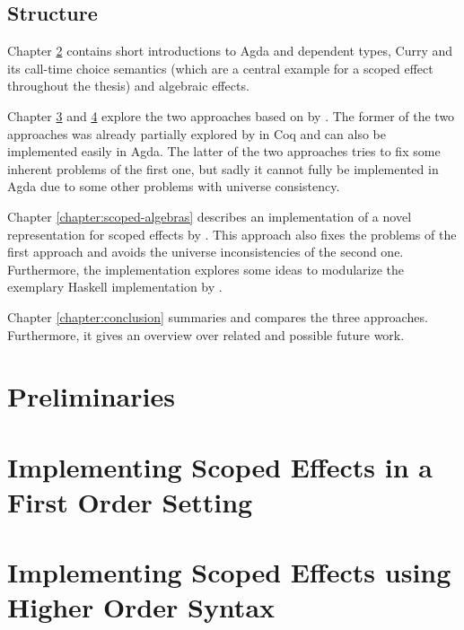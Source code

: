 \documentclass[10pt,a4paper,twoside,notitlepage]{report}
\begin{document}
\section{Structure}

Chapter \ref{chapter:preliminaries} contains short introductions to Agda and
dependent types, Curry and its call-time choice semantics (which are a central
example for a scoped effect throughout the thesis) and algebraic effects.

Chapter \ref{chapter:first-order} and \ref{chapter:higher-order} explore the two
approaches based on  by
\textcite{DBLP:conf/haskell/WuSH14}.
The former of the two approaches was already partially explored by
\textcite{bunkenburg2019modeling} in Coq and can also be implemented
easily in Agda.
The latter of the two approaches tries to fix some inherent problems of the
first one, but sadly it cannot fully be implemented in Agda due to some other
problems with universe consistency.

Chapter \ref{chapter:scoped-algebras} describes an implementation of a novel
representation for scoped effects by \textcite{DBLP:conf/lics/PirogSWJ18}.
This approach also fixes the problems of the first approach and avoids the
universe inconsistencies of the second one.
Furthermore, the implementation explores some ideas to modularize the exemplary
Haskell implementation by \citeauthor{DBLP:conf/lics/PirogSWJ18}.

Chapter \ref{chapter:conclusion} summaries and compares the three approaches.
Furthermore, it gives an overview over related and possible future work.

\chapter{Preliminaries}
\label{chapter:preliminaries}


\chapter{Implementing Scoped Effects in a First Order Setting}
\label{chapter:first-order}


\chapter{Implementing Scoped Effects using Higher Order Syntax}
\label{chapter:higher-order}

\end{document}
